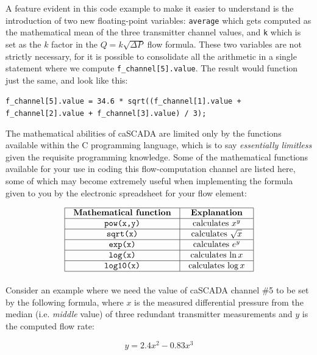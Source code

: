\vskip 10pt
A feature evident in this code example to make it easier to understand is the introduction of two new floating-point variables: {\tt average} which gets computed as the mathematical mean of the three transmitter channel values, and {\tt k} which is set as the $k$ factor in the $Q = k \sqrt{\Delta P}$ flow formula.  These two variables are not strictly necessary, for it is possible to consolidate all the arithmetic in a single statement where we compute {\tt f\_channel[5].value}.  The result would function just the same, and look like this:

\vskip 10pt

\noindent
{\tt  f\_channel[5].value = 34.6 * sqrt((f\_channel[1].value + f\_channel[2].value + f\_channel[3].value) / 3);}

\vskip 10pt

The mathematical abilities of caSCADA are limited only by the functions available within the C programming language, which is to say {\it essentially limitless} given the requisite programming knowledge.  Some of the mathematical functions available for your use in coding this flow-computation channel are listed here, some of which may become extremely useful when implementing the formula given to you by the electronic spreadsheet for your flow element:


$$\vbox{\offinterlineskip
\halign{\strut
\vrule \quad\hfil # \ \hfil & 
\vrule \quad\hfil # \ \hfil \vrule \cr
\noalign{\hrule}
%
{\bf Mathematical function} & {\bf Explanation} \cr
%
\noalign{\hrule}
%
{\tt pow(x,y)} & calculates $x^y$ \cr
%
\noalign{\hrule}
%
{\tt sqrt(x)} & calculates $\sqrt{x}$ \cr
%
\noalign{\hrule}
%
{\tt exp(x)} & calculates $e^y$ \cr
%
\noalign{\hrule}
%
{\tt log(x)} & calculates $\ln x$ \cr
%
\noalign{\hrule}
%
{\tt log10(x)} & calculates $\log x$ \cr
%
\noalign{\hrule}
} %
}$$ %

\vfil \eject

Consider an example where we need the value of caSCADA channel \#5 to be set by the following formula, where $x$ is the measured differential pressure from the median (i.e. {\it middle} value) of three redundant transmitter measurements and $y$ is the computed flow rate:

$$y = 2.4x^2 - 0.83x^3$$

